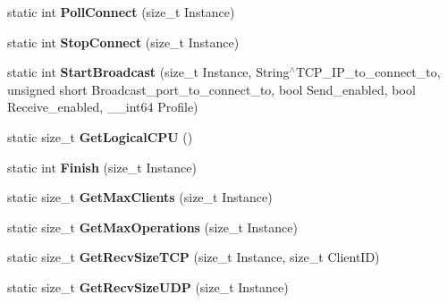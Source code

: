 \begin{DoxyCompactItemize}
\item 
\hypertarget{structmn_c_l_r_abaf293f4a62834c456834d6e88ec8fb3}{
static int {\bfseries PollConnect} (size\_\-t Instance)}
\label{structmn_c_l_r_abaf293f4a62834c456834d6e88ec8fb3}

\item 
\hypertarget{structmn_c_l_r_afa7913e530a92a53d892dfe5b53bb2e9}{
static int {\bfseries StopConnect} (size\_\-t Instance)}
\label{structmn_c_l_r_afa7913e530a92a53d892dfe5b53bb2e9}

\item 
\hypertarget{structmn_c_l_r_a8bdec4eb3e4d4f0bbda6f91c5122b23f}{
static int {\bfseries StartBroadcast} (size\_\-t Instance, String$^\wedge$TCP\_\-IP\_\-to\_\-connect\_\-to, unsigned short Broadcast\_\-port\_\-to\_\-connect\_\-to, bool Send\_\-enabled, bool Receive\_\-enabled, \_\-\_\-int64 Profile)}
\label{structmn_c_l_r_a8bdec4eb3e4d4f0bbda6f91c5122b23f}

\item 
\hypertarget{structmn_c_l_r_a9d75f8f0e5257ff1723b806044e575bd}{
static size\_\-t {\bfseries GetLogicalCPU} ()}
\label{structmn_c_l_r_a9d75f8f0e5257ff1723b806044e575bd}

\item 
\hypertarget{structmn_c_l_r_aeb301de407ac36fb1397581ed2924bc5}{
static int {\bfseries Finish} (size\_\-t Instance)}
\label{structmn_c_l_r_aeb301de407ac36fb1397581ed2924bc5}

\item 
\hypertarget{structmn_c_l_r_a04780e0b9365a0d84b5382125d73665e}{
static size\_\-t {\bfseries GetMaxClients} (size\_\-t Instance)}
\label{structmn_c_l_r_a04780e0b9365a0d84b5382125d73665e}

\item 
\hypertarget{structmn_c_l_r_a4c4dcc123b721af2289b2ca12634e676}{
static size\_\-t {\bfseries GetMaxOperations} (size\_\-t Instance)}
\label{structmn_c_l_r_a4c4dcc123b721af2289b2ca12634e676}

\item 
\hypertarget{structmn_c_l_r_a796e5d54653094dfd24baa38c98ccffb}{
static size\_\-t {\bfseries GetRecvSizeTCP} (size\_\-t Instance, size\_\-t ClientID)}
\label{structmn_c_l_r_a796e5d54653094dfd24baa38c98ccffb}

\item 
\hypertarget{structmn_c_l_r_abafc4e2331a7d589dabbf470350f84c5}{
static size\_\-t {\bfseries GetRecvSizeUDP} (size\_\-t Instance)}
\label{structmn_c_l_r_abafc4e2331a7d589dabbf470350f84c5}


\end{DoxyCompactItemize}
